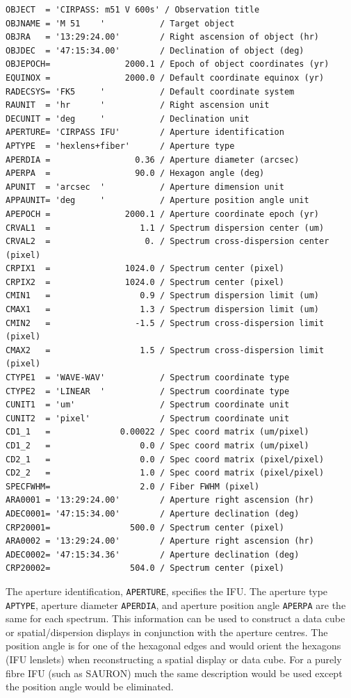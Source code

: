 \documentclass[twoside,11pt]{article}
\newcommand{\htmlref}[2]{#1}
\begin{document}
\small\begin{verbatim}
OBJECT  = 'CIRPASS: m51 V 600s' / Observation title
OBJNAME = 'M 51    '           / Target object
OBJRA   = '13:29:24.00'        / Right ascension of object (hr)
OBJDEC  = '47:15:34.00'        / Declination of object (deg)
OBJEPOCH=               2000.1 / Epoch of object coordinates (yr)
EQUINOX =               2000.0 / Default coordinate equinox (yr)
RADECSYS= 'FK5     '           / Default coordinate system
RAUNIT  = 'hr      '           / Right ascension unit
DECUNIT = 'deg     '           / Declination unit
APERTURE= 'CIRPASS IFU'        / Aperture identification
APTYPE  = 'hexlens+fiber'      / Aperture type
APERDIA =                 0.36 / Aperture diameter (arcsec)
APERPA  =                 90.0 / Hexagon angle (deg)
APUNIT  = 'arcsec  '           / Aperture dimension unit
APPAUNIT= 'deg     '           / Aperture position angle unit
APEPOCH =               2000.1 / Aperture coordinate epoch (yr)
CRVAL1  =                  1.1 / Spectrum dispersion center (um)
CRVAL2  =                   0. / Spectrum cross-dispersion center (pixel)
CRPIX1  =               1024.0 / Spectrum center (pixel)
CRPIX2  =               1024.0 / Spectrum center (pixel)
CMIN1   =                  0.9 / Spectrum dispersion limit (um)
CMAX1   =                  1.3 / Spectrum dispersion limit (um)
CMIN2   =                 -1.5 / Spectrum cross-dispersion limit (pixel)
CMAX2   =                  1.5 / Spectrum cross-dispersion limit (pixel)
CTYPE1  = 'WAVE-WAV'           / Spectrum coordinate type
CTYPE2  = 'LINEAR  '           / Spectrum coordinate type
CUNIT1  = 'um'                 / Spectrum coordinate unit
CUNIT2  = 'pixel'              / Spectrum coordinate unit
CD1_1   =              0.00022 / Spec coord matrix (um/pixel)
CD1_2   =                  0.0 / Spec coord matrix (um/pixel)
CD2_1   =                  0.0 / Spec coord matrix (pixel/pixel)
CD2_2   =                  1.0 / Spec coord matrix (pixel/pixel)
SPECFWHM=                  2.0 / Fiber FWHM (pixel)
ARA0001 = '13:29:24.00'        / Aperture right ascension (hr)
ADEC0001= '47:15:34.00'        / Aperture declination (deg)
CRP20001=                500.0 / Spectrum center (pixel)
ARA0002 = '13:29:24.00'        / Aperture right ascension (hr)
ADEC0002= '47:15:34.36'        / Aperture declination (deg)
CRP20002=                504.0 / Spectrum center (pixel)
\end{verbatim}\normalsize

The aperture identification, {\tt APERTURE}, specifies the IFU.  The
aperture type {\tt APTYPE}, aperture diameter {\tt APERDIA}, and
aperture position angle {\tt APERPA} are the same for each spectrum.
This information can be used to \htmlref{construct a data
cube}{sc16_mef2cub} or
spatial/dispersion displays in conjunction with the aperture centres.
The position angle is for one of the hexagonal edges and would orient
the hexagons (IFU lenslets) when reconstructing a spatial display or
data cube.  For a purely fibre IFU (such as SAURON) much the same
description would be used except the position angle would be
eliminated.
\end{document}
